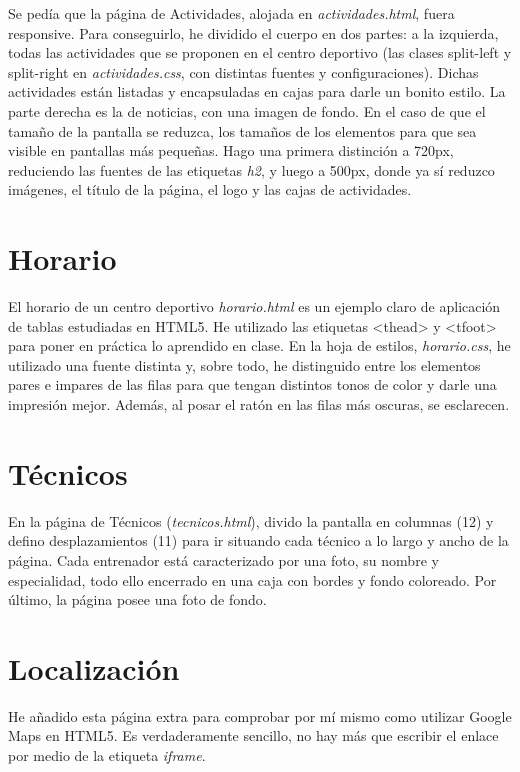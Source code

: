 Se pedía que la página de Actividades, alojada en \textit{actividades.html}, fuera responsive. Para conseguirlo, he dividido el cuerpo en dos partes: a la izquierda, todas las actividades que se proponen en el centro deportivo (las clases split-left y split-right en \textit{actividades.css}, con distintas fuentes y configuraciones). Dichas actividades están listadas y encapsuladas en cajas para darle un bonito estilo. La parte derecha es la de noticias, con una imagen de fondo. En el caso de que el tamaño de la pantalla se reduzca, los tamaños de los elementos para que sea visible en pantallas más pequeñas. Hago una primera distinción a 720px, reduciendo las fuentes de las etiquetas \textit{h2}, y luego a 500px, donde ya sí reduzco imágenes, el título de la página, el logo y las cajas de actividades.

\section{Horario}

El horario de un centro deportivo \textit{horario.html} es un ejemplo claro de aplicación de tablas estudiadas en HTML5. He utilizado las etiquetas <thead> y <tfoot> para poner en práctica lo aprendido en clase. En la hoja de estilos, \textit{horario.css}, he utilizado una fuente distinta y, sobre todo, he distinguido entre los elementos  pares e impares de las filas para que tengan distintos tonos de color y darle una impresión mejor. Además, al posar el ratón en las filas más oscuras, se esclarecen.

\section{Técnicos}

En la página de Técnicos (\textit{tecnicos.html}), divido la pantalla en columnas (12) y defino desplazamientos (11) para ir situando cada técnico a lo largo y ancho de la página. Cada entrenador está caracterizado por una foto, su nombre y especialidad, todo ello encerrado en una caja con bordes y fondo coloreado. Por último, la página posee una foto de fondo.

\section{Localización}

He añadido esta página extra para comprobar por mí mismo como utilizar Google Maps en HTML5. Es verdaderamente sencillo, no hay más que escribir el enlace por medio de la etiqueta \textit{iframe}.

